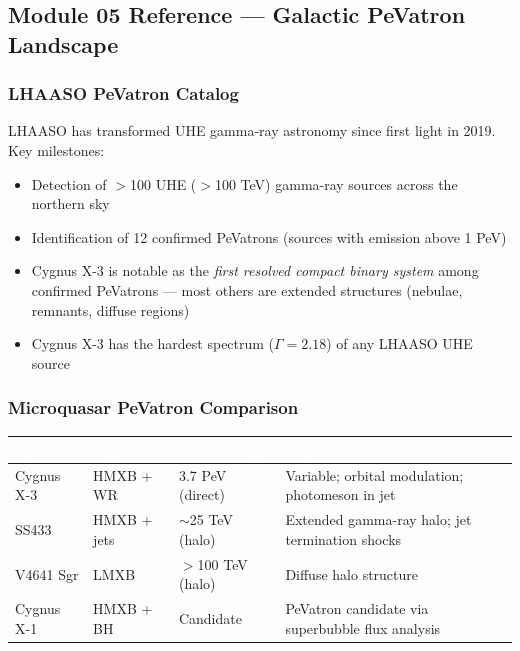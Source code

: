 \documentclass[11pt,letterpaper]{article}
\newcommand{\tableheader}[1]{\textbf{\sffamily\textcolor{white}{#1}}}
\begin{document}
\subsection{Module 05 Reference --- Galactic PeVatron Landscape}

\subsubsection{LHAASO PeVatron Catalog}

LHAASO has transformed UHE gamma-ray astronomy since first light in 2019. Key milestones:
\begin{itemize}[noitemsep]
  \item Detection of $>$100 UHE ($>$100 TeV) gamma-ray sources across the northern sky
  \item Identification of 12 confirmed PeVatrons (sources with emission above 1 PeV)
  \item Cygnus X-3 is notable as the \emph{first resolved compact binary system} among confirmed PeVatrons --- most others are extended structures (nebulae, remnants, diffuse regions)
  \item Cygnus X-3 has the hardest spectrum ($\Gamma = 2.18$) of any LHAASO UHE source
\end{itemize}

\subsubsection{Microquasar PeVatron Comparison}

\begin{center}
\begin{tabularx}{\textwidth}{L{2.8cm}L{2.8cm}L{2.8cm}X}
\toprule
{}
\tableheader{System} & \tableheader{Type} & \tableheader{Max Energy} & \tableheader{Key Feature} \\
\midrule
Cygnus X-3 & HMXB + WR & 3.7 PeV (direct) & Variable; orbital modulation; photomeson in jet \\
SS433 & HMXB + jets & $\sim$25 TeV (halo) & Extended gamma-ray halo; jet termination shocks \\
V4641 Sgr & LMXB & $>$100 TeV (halo) & Diffuse halo structure \\
Cygnus X-1 & HMXB + BH & Candidate & PeVatron candidate via superbubble flux analysis \\
\bottomrule
\end{tabularx}
\end{center}
\end{document}
